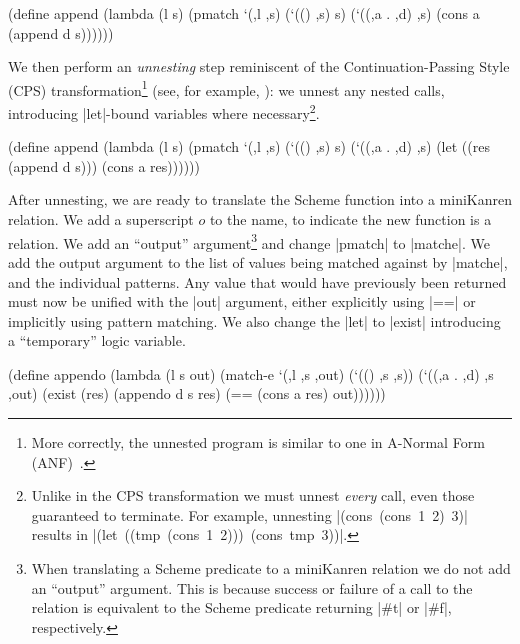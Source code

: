 \schemedisplayspace
\begin{schemedisplay}
(define append
  (lambda (l s)
    (pmatch `(,l ,s)
      (`(() ,s) s)
      (`((,a . ,d) ,s)
       (cons a (append d s))))))
\end{schemedisplay}

We then perform an \emph{unnesting} step reminiscent of the
Continuation-Passing Style (CPS) transformation\footnote{More correctly, the unnested program is
  similar to one in A-Normal Form (ANF)~\cite{essencecompiling}.}
 (see, for example, \citet{eopl3}): we unnest
any nested calls, introducing \scheme|let|-bound variables
where necessary\footnote{Unlike in the CPS transformation we must
  unnest \emph{every} call, even those guaranteed to terminate.
  For example, unnesting \mbox{\scheme|(cons (cons 1 2) 3)|} results
  in \mbox{\scheme|(let ((tmp (cons 1 2))) (cons tmp 3))|}.}.

\schemedisplayspace
\begin{schemedisplay}
(define append
  (lambda (l s)
    (pmatch `(,l ,s)
      (`(() ,s) s)
      (`((,a . ,d) ,s)
       (let ((res (append d s)))
         (cons a res))))))
\end{schemedisplay}

After unnesting, we are ready to translate the Scheme function into a
miniKanren relation.  We add a superscript $o$ to the name, to
indicate the new function is a relation.  We add an ``output''
argument\footnote{When translating a Scheme predicate to a miniKanren
  relation we do not add an ``output'' argument. This is because success
  or failure of a call to the relation is equivalent to the Scheme
  predicate returning \scheme|#t| or \scheme|#f|, respectively.} and
change \scheme|pmatch| to \scheme|matche|.  We add the output argument
to the list of values being matched against by \scheme|matche|, and the
individual patterns.  Any value that would have previously been returned
must now be unified with the \scheme|out| argument, either explicitly
using \scheme|==| or implicitly using pattern matching.  We also
change the \scheme|let| to \scheme|exist| introducing a ``temporary''
logic variable.

\newpage

\begin{schemedisplay}
(define appendo
  (lambda (l s out)
    (match-e `(,l ,s ,out)
      (`(() ,s ,s))
      (`((,a . ,d) ,s ,out)
       (exist (res)
         (appendo d s res)
         (== (cons a res) out))))))
\end{schemedisplay}

